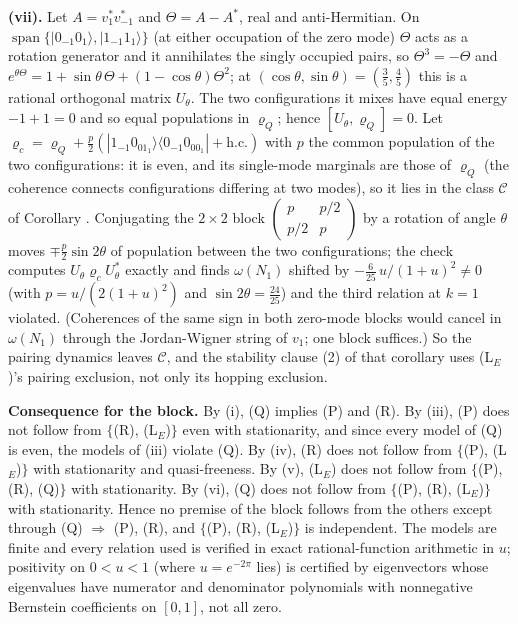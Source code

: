 \textbf{(vii).} Let $A = v_1^{*}v_{-1}^{*}$ and $\Theta = A - A^{*}$, real and anti-Hermitian. On $\operatorname{span}\{|0_{-1}0_1\rangle, |1_{-1}1_1\rangle\}$ (at either occupation of the zero mode) $\Theta$ acts as a rotation generator and it annihilates the singly occupied pairs, so $\Theta^{3} = -\Theta$ and $e^{\theta\Theta} = 1 + \sin\theta\,\Theta + (1 - \cos\theta)\Theta^{2}$; at $(\cos\theta, \sin\theta) = (\tfrac35, \tfrac45)$ this is a rational orthogonal matrix $U_\theta$. The two configurations it mixes have equal energy $-1 + 1 = 0$ and so equal populations in $\varrho_Q$; hence $[U_\theta, \varrho_Q] = 0$. Let $\varrho_c = \varrho_Q + \tfrac{p}{2}(|1_{-1}0_01_1\rangle\langle 0_{-1}0_00_1| + \text{h.c.})$ with $p$ the common population of the two configurations: it is even, and its single-mode marginals are those of $\varrho_Q$ (the coherence connects configurations differing at two modes), so it lies in the class $\mathcal{C}$ of Corollary . Conjugating the $2 \times 2$ block $\left(\begin{smallmatrix} p & p/2 \\ p/2 & p\end{smallmatrix}\right)$ by a rotation of angle $\theta$ moves $\mp\tfrac{p}{2}\sin 2\theta$ of population between the two configurations; the check computes $U_\theta\varrho_cU_\theta^{*}$ exactly and finds $\omega(N_1)$ shifted by $-\tfrac{6}{25}\,u/(1 + u)^{2} \neq 0$ (with $p = u/(2(1 + u)^{2})$ and $\sin 2\theta = \tfrac{24}{25}$) and the third relation at $k = 1$ violated. (Coherences of the same sign in both zero-mode blocks would cancel in $\omega(N_1)$ through the Jordan-Wigner string of $v_1$; one block suffices.) So the pairing dynamics leaves $\mathcal{C}$, and the stability clause (2) of that corollary uses (L$_E$)'s pairing exclusion, not only its hopping exclusion.

\textbf{Consequence for the block.} By (i), (Q) implies (P) and (R). By (iii), (P) does not follow from $\{$(R), (L$_E$)$\}$ even with stationarity, and since every model of (Q) is even, the models of (iii) violate (Q). By (iv), (R) does not follow from $\{$(P), (L$_E$)$\}$ with stationarity and quasi-freeness. By (v), (L$_E$) does not follow from $\{$(P), (R), (Q)$\}$ with stationarity. By (vi), (Q) does not follow from $\{$(P), (R), (L$_E$)$\}$ with stationarity. Hence no premise of the block follows from the others except through (Q) $\Rightarrow$ (P), (R), and $\{$(P), (R), (L$_E$)$\}$ is independent. The models are finite and every relation used is verified in exact rational-function arithmetic in $u$; positivity on $0 < u < 1$ (where $u = e^{-2\pi}$ lies) is certified by eigenvectors whose eigenvalues have numerator and denominator polynomials with nonnegative Bernstein coefficients on $[0, 1]$, not all zero.
